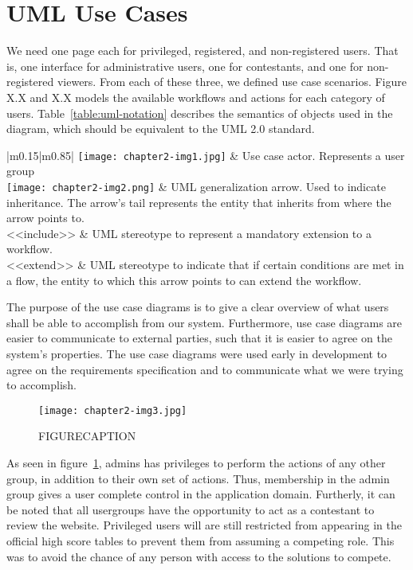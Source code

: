 \section{UML Use Cases}
We need one page each for privileged, registered, and non-registered
users. That is, one interface for administrative users, one for
contestants, and one for non-registered viewers. From each of these
three, we defined use case scenarios. Figure X.X and X.X models the
available workflows and actions for each category of users. Table~\ref{table:uml-notation}
describes the semantics of objects used in the diagram, which should be
equivalent to the UML 2.0 standard.
\begin{table}
\caption{UML Notation}
\label{table:uml-notation}
\tablehead{}
\begin{supertabular}{|m{0.15\textwidth}|m{0.85\textwidth}|}
\hline
	\texttt{[image: chapter2-img1.jpg]}  &
Use case actor. Represents a user group\\\hline
	\texttt{[image: chapter2-img2.png]}  &
UML generalization arrow. Used to indicate inheritance. The
arrow's tail represents the entity that
inherits from where the arrow points to.\\\hline
{\textless}{\textless}include{\textgreater}{\textgreater} &
UML stereotype to represent a mandatory extension to a
workflow.\\\hline
{\textless}{\textless}extend{\textgreater}{\textgreater} &
UML stereotype to indicate that if certain conditions are met in a flow,
the entity to which this arrow points to can extend the
workflow.\\\hline
\end{supertabular}
\end{table}

The purpose of the use case diagrams is to give a clear overview of what
users shall be able to accomplish from our system. Furthermore, use
case diagrams are easier to communicate to external parties, such that
it is easier to agree on the system's properties. The
use case diagrams were used early in development to agree on the
requirements specification and to communicate what we
were trying to accomplish.

\begin{figure}[h!]
	\texttt{[image: chapter2-img3.jpg]} 
	\caption{FIGURECAPTION}
	\label{figure:usecase}
\end{figure}
As seen in figure~\ref{figure:usecase}, admins has privileges to perform the actions of
any other group, in addition to their own set of actions. Thus,
membership in the admin group gives a user complete control in the
application domain. Furtherly, it can be noted that all usergroups have
the opportunity to act as a contestant to review the website.
Privileged users will are still restricted from appearing in the
official high score tables to prevent them from assuming a competing
role. This was to avoid the chance of any person with access to the
solutions to compete.







